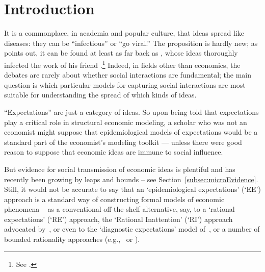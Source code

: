 \section{Introduction}
\label{chap1:sec1}

It is a commonplace, in academia and popular culture, that ideas spread like diseases: they can be ``infectious'' or ``go viral.''  The proposition is hardly new; as \cite{shiller2017narrative} points out, it can be found at least as far back as \cite{humeenquiry},
whose ideas thoroughly infected the work of his friend \cite{smithwealth}.\footnote{See \cite{rasmussen2017infidel}.} Indeed, %
in fields other than economics, the debates are rarely about whether social interactions are fundamental; the main question is which particular models for capturing social interactions are most suitable for understanding the spread of which kinds of ideas.

``Expectations'' are just a category of ideas.  So upon being told that expectations play a critical role in structural economic modeling, a scholar who was not an economist might suppose that epidemiological models of  expectations would be a standard part of the economist's modeling toolkit --- unless there were good reason to suppose that economic ideas are immune to social influence.

But evidence for social transmission of economic ideas is plentiful and has recently been growing by leaps and bounds -- see Section~\ref{subsec:microEvidence}.  Still, it would not be accurate to say that an `epidemiological expectations' (`EE') approach is a standard way of constructing formal models of economic phenomena -- as a conventional off-the-shelf alternative, say, to a `rational expectations' (`RE') approach, the `Rational Inattention' (`RI') approach advocated by~\cite{sims2003implications}, or even to the `diagnostic expectations' model of~\cite{bordalo2018diagnostic}, or a number of bounded rationality approaches (e.g.,~\cite{gabaix2020behavioral} or \cite{ilut2020economic}).

